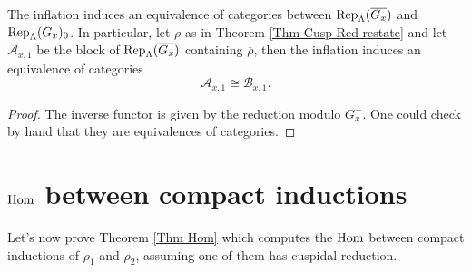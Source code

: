 	\begin{lemma}\label{Lemma A to B}
	    The inflation induces an equivalence of categories between $\operatorname{\operatorname{Rep}}_{\Lambda}(\overline{G_x})$ and $\operatorname{\operatorname{Rep}}_{\Lambda}(G_x)_0$. In particular, let $\rho$ as in Theorem \ref{Thm Cusp Red restate} and let $\mathcal{A}_{x,1}$ be the block of $\operatorname{\operatorname{Rep}}_{\Lambda}(\overline{G_x})$ containing $\overline{\rho}$, then the inflation induces an equivalence of categories 
	    $$\mathcal{A}_{x,1} \cong \mathcal{B}_{x,1}.$$
	\end{lemma}
	
	\begin{proof}
		The inverse functor is given by the reduction modulo $G_x^+$. One could check by hand that they are equivalences of categories.
	\end{proof}
	
	




	
	
	
	
	\section{$\operatorname{\operatorname{Hom}}$ between compact inductions}\label{Sec Pf Thm Hom}
	
	Let's now prove Theorem \ref{Thm Hom} which computes the $\operatorname{\operatorname{Hom}}$ between compact inductions of $\rho_1$ and $\rho_2$, assuming one of them has cuspidal reduction.
	
